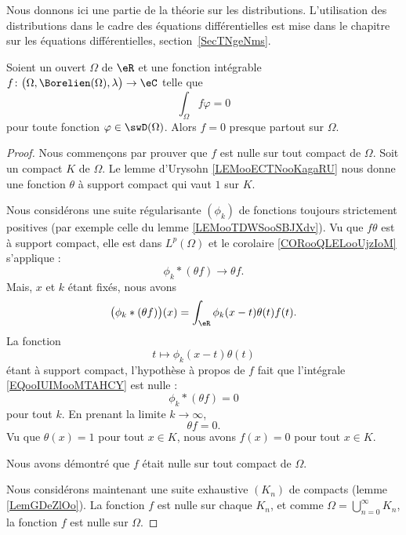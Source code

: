 
Nous donnons ici une partie de la théorie sur les distributions. L'utilisation des distributions dans le cadre des équations différentielles est mise dans le chapitre sur les équations différentielles, section~\ref{SecTNgeNms}.

\begin{proposition} \label{PropAAjSURG}
    Soient un ouvert \( \Omega\) de \( \eR\) et une fonction intégrable \( f\colon \big( \Omega,\Borelien(\Omega),\lambda \big)\to \eC\) telle que
    \begin{equation}
        \int_{\Omega}f\varphi=0
    \end{equation}
    pour toute fonction \( \varphi\in\swD(\Omega)\). Alors \( f=0\) presque partout sur \( \Omega\).
\end{proposition}

\begin{proof}
    Nous commençons par prouver que \( f\) est nulle sur tout compact de \( \Omega\). Soit un compact \( K\) de \( \Omega\). Le lemme d'Urysohn \ref{LEMooECTNooKagaRU} nous donne une fonction \( \theta\) à support compact qui vaut \( 1\) sur \( K\).

    Nous considérons une suite régularisante \( (\phi_k)\) de fonctions toujours strictement positives (par exemple celle du lemme \ref{LEMooTDWSooSBJXdv}). Vu que \( f\theta\) est à support compact, elle est dans \( L^p(\Omega)\) et le corolaire \ref{CORooQLELooUjzIoM} s'applique :
    \begin{equation}
        \phi_k*(\theta f)\to \theta f.
    \end{equation}
    Mais, \( x\) et \( k\) étant fixés, nous avons
    \begin{equation}        \label{EQooIUIMooMTAHCY}
        \big( \phi_k* (\theta f) \big)(x)=\int_{\eR}\phi_k(x-t)\theta(t)f(t).
    \end{equation}
    La fonction
    \begin{equation}
        t\mapsto \phi_k(x-t)\theta(t)
    \end{equation}
    étant à support compact, l'hypothèse à propos de \( f\) fait que l'intégrale \eqref{EQooIUIMooMTAHCY} est nulle :
    \begin{equation}
        \phi_k*(\theta f)=0
    \end{equation}
    pour tout \( k\). En prenant la limite \( k\to \infty\),
    \begin{equation}
        \theta f=0.
    \end{equation}
    Vu que \( \theta(x)=1\) pour tout \( x\in K\), nous avons \( f(x)=0\) pour tout \( x\in K\).

    Nous avons démontré que \( f\) était nulle sur tout compact de \( \Omega\).

    Nous considérons maintenant une suite exhaustive \( (K_n)\) de compacts (lemme \ref{LemGDeZlOo}). La fonction \( f\) est nulle sur chaque \( K_n\), et comme \( \Omega=\bigcup_{n=0}^{\infty}K_n\), la fonction \( f\) est nulle sur \( \Omega\).
\end{proof}


